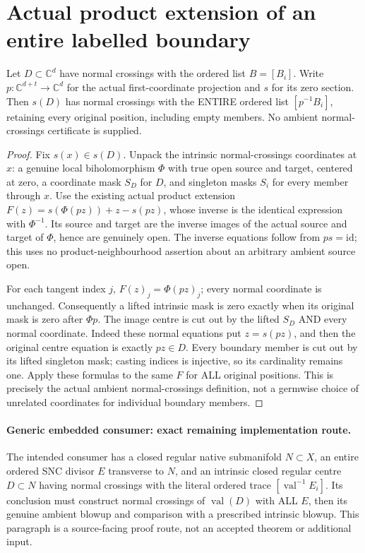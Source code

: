 \section{Actual product extension of an entire labelled boundary}

\begin{theorem}
\label{hir:disjoint-product-whole-boundary-lift}
\leanok
Let $D\subset\mathbb C^d$ have normal crossings with the ordered list
$B=[B_i]$. Write $p:\mathbb C^{d+t}\to\mathbb C^d$ for the actual first-coordinate
projection and $s$ for its zero section. Then $s(D)$ has normal crossings with
the ENTIRE ordered list $[p^{-1}B_i]$, retaining every original position,
including empty members. No ambient normal-crossings certificate is supplied.
\end{theorem}
\begin{proof}
Fix $s(x)\in s(D)$. Unpack the intrinsic normal-crossings coordinates at
$x$: a genuine local biholomorphism $\Phi$ with true open source and target,
centered at zero, a coordinate mask $S_D$ for $D$, and singleton masks $S_i$
for every member through $x$. Use the existing actual product extension
$F(z)=s(\Phi(pz))+z-s(pz)$, whose inverse is the identical expression with
$\Phi^{-1}$. Its source and target are the inverse images of the actual
source and target of $\Phi$, hence are genuinely open. The inverse equations
follow from $ps=\mathrm{id}$; this uses no product-neighbourhood assertion
about an arbitrary ambient source open.

For each tangent index $j$, $F(z)_{j}=\Phi(pz)_j$; every normal coordinate
is unchanged. Consequently a lifted intrinsic mask is zero exactly when
its original mask is zero after $\Phi p$. The image centre is cut out by
the lifted $S_D$ AND every normal coordinate. Indeed these normal equations
put $z=s(pz)$, and then the original centre equation is exactly $pz\in D$.
Every boundary member is cut out by its lifted singleton mask; casting
indices is injective, so its cardinality remains one. Apply these formulas
to the same $F$ for ALL original positions. This is precisely the actual
ambient normal-crossings definition, not a germwise choice of unrelated
coordinates for individual boundary members.
\end{proof}

\paragraph{Generic embedded consumer: exact remaining implementation route.}
The intended consumer has a closed regular native submanifold $N\subset X$,
an entire ordered SNC divisor $E$ transverse to $N$, and an intrinsic closed
regular centre $D\subset N$ having normal crossings with the literal ordered
trace $[\operatorname{val}^{-1}E_i]$. Its conclusion must construct normal
crossings of $\operatorname{val}(D)$ with ALL $E$, then its genuine ambient
blowup and comparison with a prescribed intrinsic blowup. This paragraph is
a source-facing proof route, not an accepted theorem or additional input.

